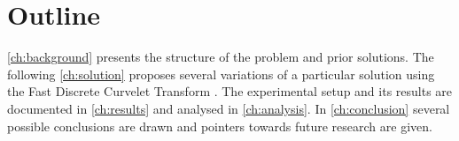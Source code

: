 \section{Outline}

\autoref{ch:background} presents the structure of the problem and prior
solutions. The following \autoref{ch:solution} proposes several variations of a
particular solution using the Fast Discrete Curvelet Transform \autocite{candes_fast_2006}. The
experimental setup and its results are documented in \autoref{ch:results} and
analysed in \autoref{ch:analysis}. In \autoref{ch:conclusion} several possible
conclusions are drawn and pointers towards future research are given.

